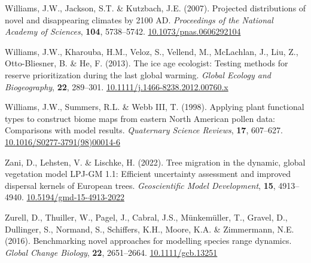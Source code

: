 \documentclass[11pt,]{article}
\newlength{\cslhangindent}
\newenvironment{CSLReferences}[2] %
 {%
  \setlength{\parindent}{0pt}
  \ifodd #1 \everypar{\setlength{\hangindent}{\cslhangindent}}\ignorespaces\fi
  \ifnum #2 > 0
  \setlength{\parskip}{#2\baselineskip}
  \fi
 }%
 {}
\begin{document}
\begin{CSLReferences}{1}{0}
\leavevmode{}%
Williams, J.W., Jackson, S.T. \& Kutzbach, J.E. (2007). Projected
distributions of novel and disappearing climates by 2100 {AD}.
\emph{Proceedings of the National Academy of Sciences}, \textbf{104},
5738--5742.
\href{https://doi.org/10.1073/pnas.0606292104}{10.1073/pnas.0606292104}

\leavevmode{}%
Williams, J.W., Kharouba, H.M., Veloz, S., Vellend, M., McLachlan, J.,
Liu, Z., Otto-Bliesner, B. \& He, F. (2013). The ice age ecologist:
Testing methods for reserve prioritization during the last global
warming. \emph{Global Ecology and Biogeography}, \textbf{22}, 289--301.
\href{https://doi.org/10.1111/j.1466-8238.2012.00760.x}{10.1111/j.1466-8238.2012.00760.x}

\leavevmode{}%
Williams, J.W., Summers, R.L. \& Webb III, T. (1998). Applying plant
functional types to construct biome maps from eastern {North} {American}
pollen data: Comparisons with model results. \emph{Quaternary Science
Reviews}, \textbf{17}, 607--627.
\href{https://doi.org/10.1016/S0277-3791(98)00014-6}{10.1016/S0277-3791(98)00014-6}

\leavevmode{}%
Zani, D., Lehsten, V. \& Lischke, H. (2022). Tree migration in the
dynamic, global vegetation model {LPJ}-{GM} 1.1: Efficient uncertainty
assessment and improved dispersal kernels of {European} trees.
\emph{Geoscientific Model Development}, \textbf{15}, 4913--4940.
\href{https://doi.org/10.5194/gmd-15-4913-2022}{10.5194/gmd-15-4913-2022}

\leavevmode{}%
Zurell, D., Thuiller, W., Pagel, J., Cabral, J.S., Münkemüller, T.,
Gravel, D., Dullinger, S., Normand, S., Schiffers, K.H., Moore, K.A. \&
Zimmermann, N.E. (2016). Benchmarking novel approaches for modelling
species range dynamics. \emph{Global Change Biology}, \textbf{22},
2651--2664. \href{https://doi.org/10.1111/gcb.13251}{10.1111/gcb.13251}

\end{CSLReferences}





\newpage
\singlespacing
\printbibliography
\end{document}
